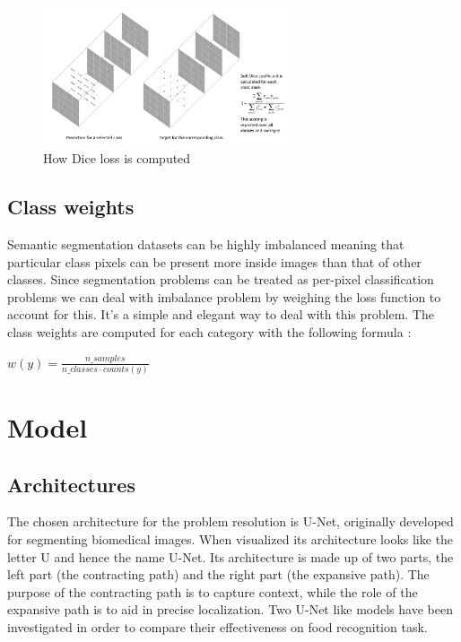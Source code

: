 \documentclass[a4paper,10pt]{report}
\begin{document}
\clearpage

\begin{figure}[h]
    \centering
    \includegraphics[width=0.65\textwidth]{assets/img/dice_loss.png}
    \caption{How Dice loss is computed \cite{semantic-segmentation}}
    \label{fig:dice_loss}
\end{figure}



\section{Class weights}\label{sec:section-37}
Semantic segmentation datasets can be highly imbalanced meaning that particular class pixels can be present more inside images than that of other classes. Since segmentation problems can be treated as per-pixel classification problems we can deal with imbalance problem by weighing the loss function to account for this. It's a simple and elegant way to deal with this problem. 
The class weights are computed for each category with the following formula \cite{class_weights}:
\begin{center}
    $w(y) = \frac{n\_samples}{n\_classes \cdot counts(y)}$
\end{center}



\chapter{Model}\label{chap:chapter-4}

\section{Architectures}\label{sec:section-41}
The chosen architecture for the problem resolution is U-Net, originally developed for segmenting biomedical images. When visualized its architecture looks like the letter U and hence the name U-Net. Its architecture is made up of two parts, the left part (the contracting path) and the right part (the expansive path). The purpose of the contracting path is to capture context, while the role of the expansive path is to aid in precise localization.
Two U-Net like models have been investigated in order to compare their effectiveness on food recognition task.
\end{document}
